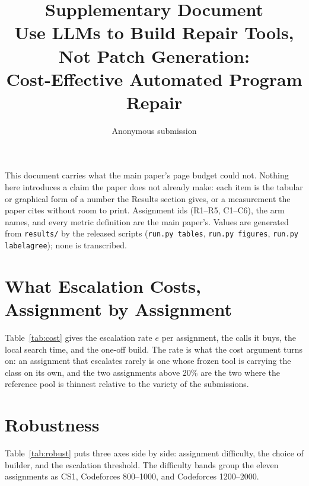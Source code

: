 \documentclass[letterpaper]{article}
\title{Supplementary Document\\
\large Use LLMs to Build Repair Tools, Not Patch Generation:\\Cost-Effective
Automated Program Repair}
\author{Anonymous submission}
\begin{document}
\maketitle

\noindent This document carries what the main paper's page budget could not.
Nothing here introduces a claim the paper does not already make: each item is
the tabular or graphical form of a number the Results section gives, or a
measurement the paper cites without room to print. Assignment ids (R1--R5,
C1--C6), the arm names, and every metric definition are the main paper's.
Values are generated from \texttt{results/} by the released scripts
(\texttt{run.py tables}, \texttt{run.py figures}, \texttt{run.py labelagree});
none is transcribed.

\section{What Escalation Costs, Assignment by Assignment}

Table~\ref{tab:cost} gives the escalation rate $e$ per assignment, the calls it
buys, the local search time, and the one-off build. The rate is what the cost
argument turns on: an assignment that escalates rarely is one whose frozen tool
is carrying the class on its own, and the two assignments above 20\% are the
two where the reference pool is thinnest relative to the variety of the
submissions.

\begin{table}[h]
\centering\small\setlength{\tabcolsep}{4pt}

\caption{Escalation and cost per assignment, \texttt{claude-sonnet-5}.}
\label{tab:cost}
\end{table}

\section{Robustness}

Table~\ref{tab:robust} puts three axes side by side: assignment difficulty, the
choice of builder, and the escalation threshold. The difficulty bands group the
eleven assignments as CS1, Codeforces 800--1000, and Codeforces 1200--2000.

\begin{table}[h]
\centering\scriptsize\setlength{\tabcolsep}{1pt}
\resizebox{\columnwidth}{!}{}
\caption{Difficulty, builder, and escalation threshold.}
\label{tab:robust}
\end{table}
\end{document}
